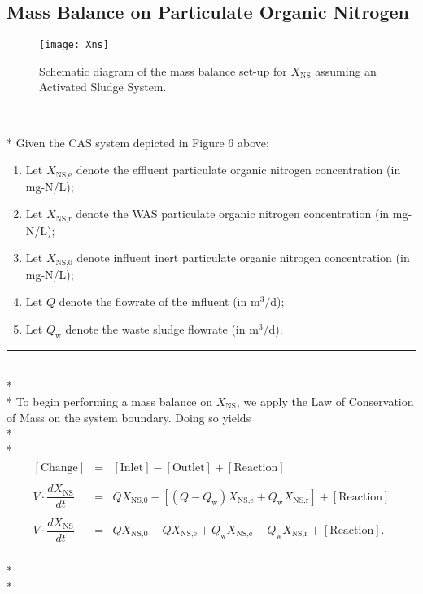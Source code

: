 \documentclass[]{article}
\begin{document}
\subsection{Mass Balance on Particulate Organic Nitrogen}
\vspace{0.25cm}
\begin{figure}[H]
	\centering
	\texttt{[image: Xns]}
	\caption{Schematic diagram of the mass balance set-up for $X_{\text{NS}}$ assuming an Activated Sludge System.}
\end{figure} 
\par\noindent\rule{\textwidth}{0.4pt} \vspace{0.1 cm} \\*
Given the CAS system depicted in Figure 6 above: \vspace{0.05 cm} \begin{enumerate}[label=(\roman*)]
	\item Let $X_{\text{NS,e}}$ denote the effluent particulate organic nitrogen concentration (in mg-N/L);
	\item Let $X_{\text{NS,r}}$ denote the WAS particulate organic nitrogen concentration (in mg-N/L);
	\item Let $X_{\text{NS,0}}$ denote influent inert particulate organic nitrogen concentration (in mg-N/L);
	\item Let $Q$ denote the flowrate of the influent (in $\text{m}^3/\text{d}$);
	\item Let $Q_{\text{w}}$ denote the waste sludge flowrate (in $\text{m}^3/\text{d}$).
\end{enumerate}
\par\noindent\rule{\textwidth}{0.4pt} \\* \\*
\noindent To begin performing a mass balance on $X_{\text{NS}}$, we apply the Law of Conservation of Mass on the system boundary. Doing so yields \\* \\* 
\begin{align}
\begin{array}{rcl}
[\text{Change}] &=& [\text{Inlet}] - [\text{Outlet}] + [\text{Reaction}] \\ \\
V \cdot \dfrac{dX_{\text{NS}}}{dt} &=& QX_{\text{NS,0}} - [(Q-Q_{\text{w}})X_{\text{NS,e}} + Q_{\text{w}}X_{\text{NS,r}}] + [\text{Reaction}] \\ \\
V \cdot \dfrac{dX_{\text{NS}}}{dt} &=& QX_{\text{NS,0}} - QX_{\text{NS,e}} + Q_{\text{w}}X_{\text{NS,e}} - Q_{\text{w}}X_{\text{NS,r}} + [\text{Reaction}].
\end{array}
\end{align} \\* \\* 
\end{document}
